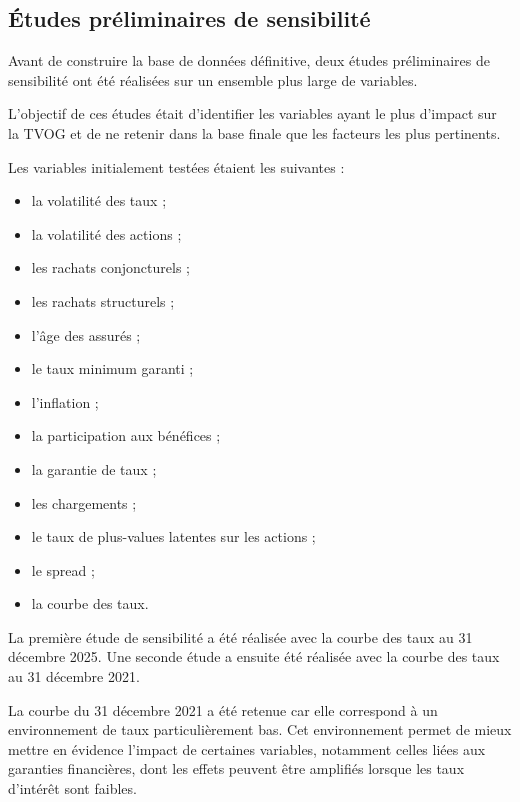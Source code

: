 
\subsection{Études préliminaires de sensibilité}

Avant de construire la base de données définitive, deux études préliminaires de sensibilité ont été réalisées sur un ensemble plus large de variables.

L'objectif de ces études était d'identifier les variables ayant le plus d'impact sur la TVOG et de ne retenir dans la base finale que les facteurs les plus pertinents.

Les variables initialement testées étaient les suivantes :

\begin{itemize}[label=\textemdash, nosep, leftmargin=2.5em]
    \item la volatilité des taux ;
    \item la volatilité des actions ;
    \item les rachats conjoncturels ;
    \item les rachats structurels ;
    \item l'âge des assurés ;
    \item le taux minimum garanti ;
    \item l'inflation ;
    \item la participation aux bénéfices ;
    \item la garantie de taux ;
    \item les chargements ;
    \item le taux de plus-values latentes sur les actions ;
    \item le spread ;
    \item la courbe des taux.
\end{itemize}

La première étude de sensibilité a été réalisée avec la courbe des taux au 31 décembre 2025. Une seconde étude a ensuite été réalisée avec la courbe des taux au 31 décembre 2021.

La courbe du 31 décembre 2021 a été retenue car elle correspond à un environnement de taux particulièrement bas. Cet environnement permet de mieux mettre en évidence l'impact de certaines variables, notamment celles liées aux garanties financières, dont les effets peuvent être amplifiés lorsque les taux d'intérêt sont faibles.

